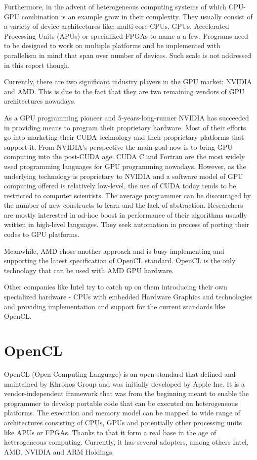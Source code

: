 Furthermore, in the advent of heterogeneous computing systems of which CPU-GPU combination is an example grow in their complexity. They usually consist of a variety of device architectures like: multi-core CPUs, GPUs, Accelerated Processing Units (APUs) or specialized FPGAs to name a a few. Programs need to be designed to work on multiple platforms and be implemented with parallelism in mind that span over number of devices. Such scale is not addressed in this report though.

Currently, there are two significant industry players in the GPU market: NVIDIA and AMD. This is due to the fact that they are two remaining vendors of GPU architectures nowadays. 

As a GPU programming pioneer and 5-years-long-runner NVIDIA has succeeded in providing means to program their proprietary hardware. Most of their efforts go into marketing their CUDA technology and their proprietary platforms that support it. From NVIDIA's perspective the main goal now is to bring GPU computing into the post-CUDA age. CUDA C and Fortran are the most widely used programming languages for GPU programming nowadays. However, as the underlying technology is proprietary to NVIDIA and a software model of GPU computing offered is relatively low-level, the use of CUDA today tends to be restricted to computer scientists. The average programmer can be discouraged by the number of new constructs to learn and the lack of abstraction. Researchers are mostly interested in ad-hoc boost in performance of their algorithms usually written in high-level languages. They seek automation in process of porting their codes to GPU platforms.

Meanwhile, AMD chose another approach and is busy implementing and supporting the latest specification of OpenCL standard. OpenCL is the only technology that can be used with AMD GPU hardware.

Other companies like Intel try to catch up on them introducing their own specialized hardware - CPUs with embedded Hardware Graphics and technologies and providing implementation and support for the current standards like OpenCL.

\section{OpenCL}
OpenCL (Open Computing Language) is an open standard that defined and maintained by Khronos Group and was initially developed by Apple Inc. It is a vendor-independent framework that was from the beginning meant to enable the programmer to develop portable code that can be executed on heterogeneous platforms. The execution and memory model can be mapped to wide range of architectures consisting of CPUs, GPUs and potentially other processing units like APUs or FPGAs. Thanks to that it form a real base in the age of heterogeneous computing. Currently, it has several adopters, among others Intel, AMD, NVIDIA and ARM Holdings.\cite{khronos2012adopt}

